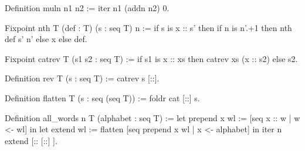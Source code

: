 \begin{Answer}[ref=ex:itermul]

\begin{coq}{}{}
Definition muln n1 n2 := iter n1 (addn n2) 0.
\end{coq}

\end{Answer}

\begin{Answer}[ref=ex:nth]

\begin{coq}{}{}
Fixpoint nth T (def : T) (s : seq T) n :=
  if s is x :: s' then if n is n'.+1 then nth def s' n' else x else def.
\end{coq}

\end{Answer}

\begin{Answer}[ref=ex:rev]

\begin{coq}{}{}
Fixpoint catrev T (s1 s2 : seq T) :=
  if s1 is x :: xs then catrev xs (x :: s2) else s2.

Definition rev T (s : seq T) := catrev s [::].
\end{coq}

\end{Answer}


\begin{Answer}[ref=ex:flatten]

\begin{coq}{}{}
Definition flatten T (s : seq (seq T)) := foldr cat [::] s.
\end{coq}

\end{Answer}

\begin{Answer}[ref=ex:allwords]

\begin{coq}{}{}
Definition all_words n T (alphabet : seq T) :=
  let prepend x wl := [seq x :: w | w <- wl] in
  let extend wl := flatten [seq prepend x wl | x <- alphabet] in
  iter n extend [:: [::] ].
\end{coq}

\end{Answer}



